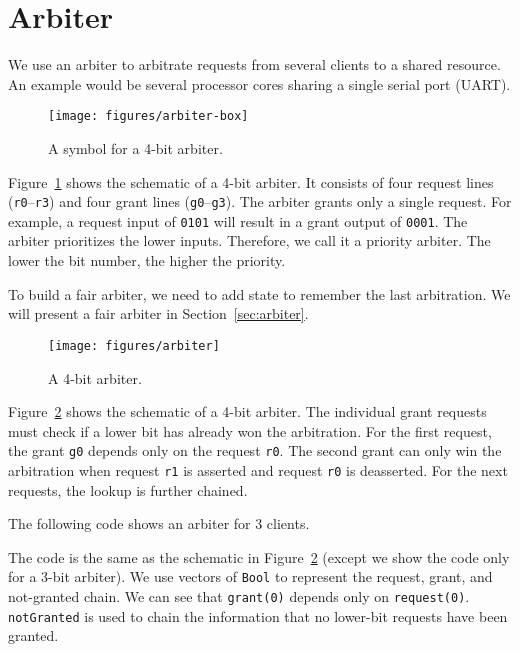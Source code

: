 \documentclass[%
    10pt,
    headinclude, footexclude,
    openright, %
    notitlepage,
    cleardoubleempty,
    headsepline,
    pointlessnumbers,
    bibtotoc, idxtotoc,
    ]{scrbook}
\newcommand{\scale}{0.7}
\newcommand{\code}[1]{{\lstinline[basicstyle=\small\ttfamily]{#1}}}
\begin{document}
\section{Arbiter}
\label{sec:arbiter}


We use an arbiter to arbitrate requests from several clients to a shared resource.
An example would be several processor cores sharing a single serial port (UART).

\begin{figure}
  \centering
  \texttt{[image: figures/arbiter-box]}
  \caption{A symbol for a 4-bit arbiter.}
  \label{fig:arbiter-box}
\end{figure}

Figure~\ref{fig:arbiter-box} shows the schematic of a 4-bit arbiter.
It consists of four request lines (\code{r0}--\code{r3}) and four grant lines
(\code{g0}--\code{g3}). The arbiter grants only a single request.
For example, a request input of \code{0101} will result in
a grant output of \code{0001}. The arbiter prioritizes the lower
inputs. Therefore, we call it a priority arbiter. The lower the bit number,
the higher the priority.

To build a fair arbiter, we need to add state to remember the last arbitration.
We will present a fair %
arbiter in Section~\ref{sec:arbiter}.

\begin{figure}
  \centering
  \texttt{[image: figures/arbiter]}
  \caption{A 4-bit arbiter.}
  \label{fig:arbiter}
\end{figure}

Figure~\ref{fig:arbiter} shows the schematic of a 4-bit arbiter.
The individual grant requests must check if a lower bit has already
won the arbitration. For the first request, the grant \code{g0} depends only on the
request \code{r0}. The second grant can only win the arbitration when request \code{r1}
is asserted and request \code{r0} is deasserted. For the next requests, the lookup
is further chained.

The following code shows an arbiter for 3 clients.


\noindent The code is the same as the schematic in Figure~\ref{fig:arbiter}
(except we show the code only for a 3-bit arbiter).
We use vectors of \code{Bool} to represent the request, grant, and not-granted chain.
We can see that \code{grant(0)} depends only on \code{request(0)}.
\code{notGranted} is used to chain the information that no lower-bit requests
have been granted.
\end{document}
